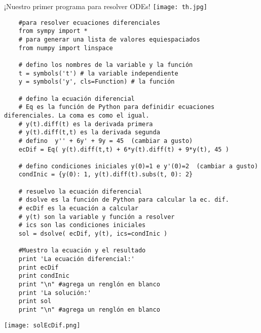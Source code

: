 \documentclass{beamer}
\begin{document}
\begin{frame}{¡Nuestro primer programa para resolver ODEs!}
 \texttt{[image: th.jpg]}
\scriptsize{\begin{verbatim}
	#para resolver ecuaciones diferenciales
	from sympy import *
	# para generar una lista de valores equiespaciados
	from numpy import linspace
	
	# defino los nombres de la variable y la función
	t = symbols('t') # la variable independiente
	y = symbols('y', cls=Function) # la función
	
	# defino la ecuación diferencial
	# Eq es la función de Python para definidir ecuaciones diferenciales. La coma es como el igual.
	# y(t).diff(t) es la derivada primera
	# y(t).diff(t,t) es la derivada segunda
	# defino  y'' + 6y' + 9y = 45  (cambiar a gusto)
	ecDif = Eq( y(t).diff(t,t) + 6*y(t).diff(t) + 9*y(t), 45 )
	
	# defino condiciones iniciales y(0)=1 e y'(0)=2  (cambiar a gusto)
	condInic = {y(0): 1, y(t).diff(t).subs(t, 0): 2}
	
	# resuelvo la ecuación diferencial
	# dsolve es la función de Python para calcular la ec. dif.
	# ecDif es la ecuación a calcular
	# y(t) son la variable y función a resolver
	# ics son las condiciones iniciales
	sol = dsolve( ecDif, y(t), ics=condInic )
	
	#Muestro la ecuación y el resultado
	print 'La ecuación diferencial:'
	print ecDif
	print condInic
	print "\n" #agrega un renglón en blanco
	print 'La solución:'
	print sol
	print "\n" #agrega un renglón en blanco
	\end{verbatim}}

\texttt{[image: solEcDif.png]}

\end{frame}
\end{document}
